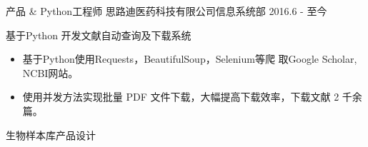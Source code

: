 

\begin{cventries}

  \cventry
    {产品 \& Python工程师 思路迪医药科技有限公司{\enskip\cdotp\enskip}信息系统部} %
    {2016.6 - 至今} %
    {
      \begin{cvitems} %
        \item 基于Python 开发文献自动查询及下载系统 
        \begin{itemize}
        	\item 基于Python使用Requests，BeautifulSoup，Selenium等爬
        	取Google Scholar, NCBI网站。
        	\item 使用并发方法实现批量 PDF 文件下载，大幅提高下载效率，下载文献 2 千余篇。
        \end{itemize}
        \item 生物样本库产品设计
      \end{cvitems}
    }

 
\end{cventries}
